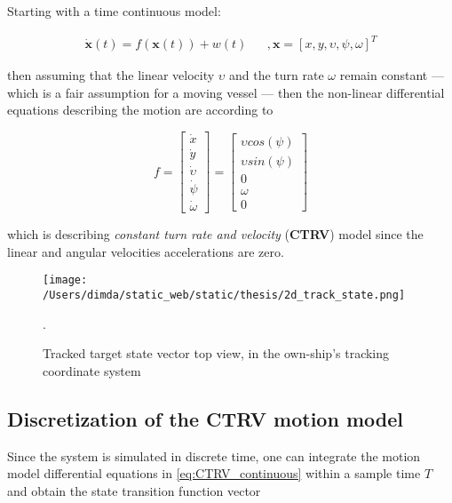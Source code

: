 Starting with a time continuous model:

\begin{equation}
\begin{aligned}\dot{\mathbf{x}}(t) = f(\mathbf{x}(t)) + w(t) &&,\mathbf{x} = \left[x,y,\upsilon, \psi,\omega\right]^{T}  \end{aligned}
\end{equation}


then assuming that the linear velocity $\upsilon$ and the turn rate $\omega$ remain constant  --- which is a fair assumption for a moving vessel --- then the non-linear differential equations describing the motion are according to \cite{Schubert2008}

\begin{equation}\label{eq:CTRV_continuous}
f =\begin{bmatrix}\dot{x} \\ \dot{y} \\ \dot{\upsilon} \\ \dot{\psi} \\ \dot{\omega}  \end{bmatrix}=  \begin{bmatrix}\upsilon cos(\psi) \\ \upsilon sin(\psi) \\ 0 \\ \omega \\ 0  \end{bmatrix}
\end{equation}

which is describing  \emph{constant turn rate and velocity} (\textbf{CTRV}) model since the linear and angular velocities accelerations are zero.


\begin{figure}[H]
	\centering
	\texttt{[image: /Users/dimda/static\_web/static/thesis/2d\_track\_state.png]}
	\caption{Tracked target state vector top view, in the own-ship's tracking coordinate system}.
	\label{fig:state_vector}
\end{figure}

\subsection{Discretization of the CTRV motion model}

Since the system is simulated in discrete time, one can integrate the motion model differential equations in \cref{eq:CTRV_continuous} within a sample time $T$ and obtain the state transition function vector


